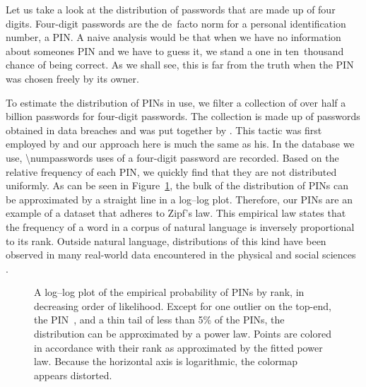 \begin{example}
\label{ex:pin}%
  Let us take a look at the distribution of passwords that are made up of four digits.
  Four-digit passwords are the de~facto norm for a personal identification number, a PIN.
  A naive analysis would be that when we have no information about someones PIN and we have to guess it, we stand a one in ten~thousand chance of being correct.
  As we shall see, this is far from the truth when the PIN was chosen freely by its owner.

  To estimate the distribution of PINs in use, we filter a collection of over half a billion passwords for four-digit passwords.
  The collection is made up of passwords obtained in data breaches and was put together by \textcite{hunt2018have}.
  This tactic was first employed by \textcite{berry2012pin} and our approach here is much the same as his.
  In the database we use, \num{\numpasswords} uses of a four-digit password are recorded.
  Based on the relative frequency of each PIN, we quickly find that they are not distributed uniformly.
  As can be seen in Figure~\ref{fig:pinprobability}, the bulk of the distribution of PINs can be approximated by a straight line in a log--log plot.
  Therefore, our PINs are an example of a dataset that adheres to Zipf's law.
  This empirical law states that the frequency of a word in a corpus of natural language is inversely proportional to its rank.
  Outside natural language, distributions of this kind have been observed in many real-world data encountered in the physical and social sciences \parencite{newman2005power}.
  \begin{figure}
    \centering
    \caption{
      A log--log plot of the empirical probability of PINs by rank, in decreasing order of likelihood.
      Except for one outlier on the top-end, the PIN~, and a thin tail of less than 5\% of the PINs, the distribution can be approximated by a power law.
      Points are colored in accordance with their rank as approximated by the fitted power law.
      Because the horizontal axis is logarithmic, the colormap appears distorted.
    }
    \label{fig:pinprobability}
  \end{figure}


\end{example}
